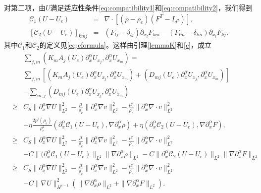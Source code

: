 对第二项，由$U$满足适应性条件\eqref{eq:compatibility1}和\eqref{eq:compatibility2}，我们得到
\begin{eqnarray} \label{c}
{\mathcal C}_1(U - U_e) &=& \nabla\cdot[(\rho - \rho_e)(F^T - I_{d^2})], \nonumber\\[2mm]
{[{\mathcal C}_2(U - U_e)]}_{kmj} &=& (F_{lj} - \delta_{lj})\partial_{x_l}F_{km} - (F_{lm} - \delta_{lm})\partial_{x_l}F_{kj}.
\end{eqnarray}
其中${\mathcal C}_1$和${\mathcal C}_2$的定义见\eqref{eq:cformula}。这样由引理\ref{lemmaK}和\eqref{c}，成立
\begin{eqnarray}\label{eq:L2com}
 && \sum_{j,m} (K_m A_j(U_e) \partial_x^\alpha U_{x_j}, \partial_x^\alpha U_{x_m}) = \\
  &&\sum_{j,m}[ (K_m A_j(U_e) \partial_x^\alpha U_{x_j}, \partial_x^\alpha U_{x_m}) + (D_{mj}(U_e) \partial_x^\alpha U_{x_j}, \partial_x^\alpha U_{x_m}) ] \nonumber \\
  && - \sum_{m,j} (D_{mj}(U_e) \partial_x^\alpha  U_{x_j}, \partial_x^\alpha U_{x_m}) \nonumber \\
   &\ge& C_S \|\partial_x^\alpha \nabla U\|_{L^2}^2 - \frac{\mu}{\rho_e} \|\partial_x^\alpha \nabla  v \|_{L^2}^2 -\frac{\mu'}{\rho_e} \|\partial_x^\alpha \nabla \cdot  v \|_{L^2}^2\nonumber \\
  &&+ \eta\frac{2p'(\rho_e)}{\rho_e^2}(\partial_x^\alpha{\mathcal C}_1(U - U_e), \nabla \partial_x^\alpha\rho) + \eta(\partial_x^\alpha{\mathcal C}_2(U - U_e), \nabla \partial_x^\alpha F), \nonumber\\
  &\ge& C_S \|\partial_x^\alpha \nabla U\|_{L^2}^2 - \frac{\mu}{\rho_e} \|\partial_x^\alpha \nabla  v \|_{L^2}^2 -\frac{\mu'}{\rho_e} \|\partial_x^\alpha \nabla \cdot  v \|_{L^2}^2\nonumber \\
  &&- C\|(\partial_x^\alpha{\mathcal C}_1(U - U_e)\|_{L^2}\|\nabla \partial_x^\alpha\rho\|_{L^2} - C\|\partial_x^\alpha{\mathcal C}_2(U - U_e)\|_{L^2}\|\nabla \partial_x^\alpha F\|_{L^2}\nonumber\\
  &\ge& C_S \|\partial_x^\alpha \nabla U\|_{L^2}^2  - \frac{\mu}{\rho_e} \|\partial_x^\alpha \nabla  v \|_{L^2}^2 -\frac{\mu'}{\rho_e} \|\partial_x^\alpha \nabla \cdot  v \|_{L^2}^2\nonumber \\
  &&- C\|\nabla U\|_{H^{s-1}}^2(\|\nabla \partial_x^\alpha\rho\|_{L^2} + \|\nabla \partial_x^\alpha F\|_{L^2}). \nonumber
\end{eqnarray}

